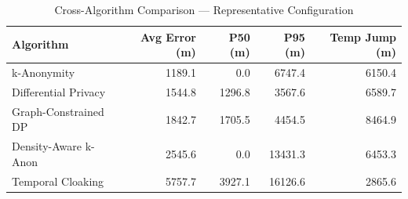 \begin{table}[htbp]
\centering
\caption{Cross-Algorithm Comparison — Representative Configuration}
\label{tab:comparison}
\begin{tabular}{lrrrr}
\toprule
Algorithm & Avg Error (m) & P50 (m) & P95 (m) & Temp Jump (m) \\
\midrule
  k-Anonymity & 1189.1 & 0.0 & 6747.4 & 6150.4 \\
  Differential Privacy & 1544.8 & 1296.8 & 3567.6 & 6589.7 \\
  Graph-Constrained DP & 1842.7 & 1705.5 & 4454.5 & 8464.9 \\
  Density-Aware k-Anon & 2545.6 & 0.0 & 13431.3 & 6453.3 \\
  Temporal Cloaking & 5757.7 & 3927.1 & 16126.6 & 2865.6 \\
\bottomrule
\end{tabular}
\end{table}